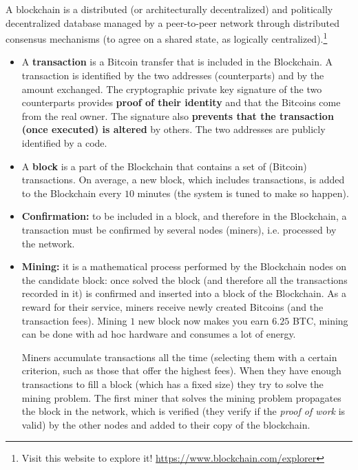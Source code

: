 A blockchain is a distributed (or architecturally decentralized) and politically decentralized database managed by a peer-to-peer network through distributed consensus mechanisms (to agree on a shared state, as logically centralized).\footnote{Visit this website to explore it! \url{https://www.blockchain.com/explorer}}
\begin{itemize}
	\item A \textbf{transaction} is a Bitcoin transfer that is included in the Blockchain. A transaction is identified by the two addresses (counterparts) and by the amount exchanged. The cryptographic private key signature of the two counterparts provides \textbf{proof of their identity} and that the Bitcoins come from the real owner. The signature also \textbf{prevents that the transaction (once executed) is altered} by others. The two addresses are publicly identified by a code.
\end{itemize}


\begin{itemize}
	\item A \textbf{block} is a part of the Blockchain that contains a set of (Bitcoin) transactions. On average, a new block, which includes transactions, is added to the Blockchain every $10$ minutes (the system is tuned to make so happen).
	\item \textbf{Confirmation:} to be included in a block, and therefore in the Blockchain, a transaction must be confirmed by several nodes (miners), i.e. processed by the network.
	\item \textbf{Mining:} it is a mathematical process performed by the Blockchain nodes on the candidate block: once solved the block (and therefore all the transactions recorded in it) is confirmed and inserted into a block of the Blockchain. As a reward for their service, miners receive newly created Bitcoins (and the transaction fees). Mining $1$ new block now makes you earn $6.25$ BTC, mining can be done with ad hoc hardware and consumes a lot of energy.
	      
	      Miners accumulate transactions all the time (selecting them with a certain criterion, such as those that offer the highest fees). When they have enough transactions to fill a block (which has a fixed size) they try to solve the mining problem. The first miner that solves the mining problem propagates the block in the network, which is verified (they verify if the \textit{proof of work} is valid) by the other nodes and added to their copy of the blockchain.
\end{itemize}

